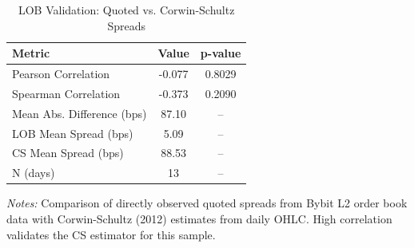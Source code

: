 
\begin{table}[htbp]
\centering
\caption{LOB Validation: Quoted vs. Corwin-Schultz Spreads}
\label{tab:lob_validation}
\small
\begin{tabular}{@{}lcc@{}}
\toprule
\textbf{Metric} & \textbf{Value} & \textbf{p-value} \\
\midrule
Pearson Correlation & -0.077 & 0.8029 \\
Spearman Correlation & -0.373 & 0.2090 \\
Mean Abs. Difference (bps) & 87.10 & -- \\
LOB Mean Spread (bps) & 5.09 & -- \\
CS Mean Spread (bps) & 88.53 & -- \\
N (days) & 13 & -- \\
\bottomrule
\end{tabular}

\vspace{0.5em}
\raggedright\footnotesize
\textit{Notes:} Comparison of directly observed quoted spreads from Bybit L2 order book data
with Corwin-Schultz (2012) estimates from daily OHLC. High correlation validates the CS estimator
for this sample.
\end{table}
